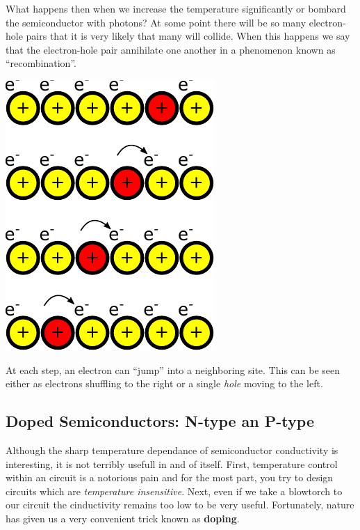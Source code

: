 \documentclass{tufte-book}
\begin{document}
What happens then when we increase the temperature significantly or bombard the semiconductor with photons? At some point there will be so many electron-hole pairs that it is very likely that many will collide. When this happens we say that the electron-hole pair annihilate one another in a phenomenon known as ``recombination''.

\begin{marginfigure}%
  \includegraphics[]{jumpin_hole}
  \caption{At each step, an electron can ``jump'' into a neighboring site. This can be seen either as electrons shuffling to the right or a single \textit{hole} moving to the left.}
  \label{fig:olez}
\end{marginfigure}

\subsection{Doped Semiconductors: N-type an P-type}
Although the sharp temperature dependance of semiconductor conductivity is interesting, it is not terribly usefull in and of itself. First, temperature control within an circuit is a notorious pain and for the most part, you try to design circuits which are \textit{temperature insensitive}. Next, even if we take a blowtorch to our circuit the cinductivity remains too low to be very useful. Fortunately, nature has given us a very convenient trick known as \textbf{doping}.
\end{document}
